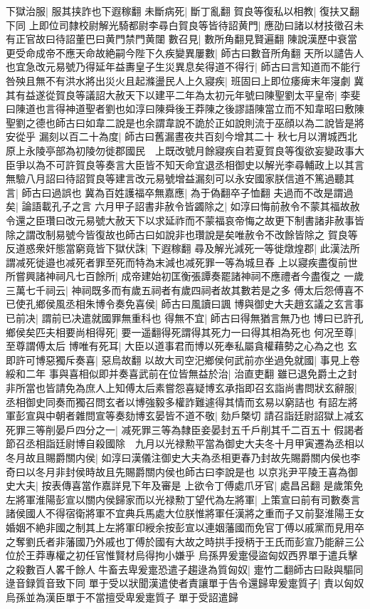 下獄治服|{
	服其挟詐也下遐稼翻}
未斷病死|{
	斷丁亂翻}
賀良等復私以相教|{
	復扶又翻下同}
上即位司隸校尉解光騎都尉李尋白賀良等皆待詔黄門|{
	應劭曰諸以材技徵召未有正官故曰待詔董巴曰黄門禁門黄闥}
數召見|{
	數所角翻見賢遍翻}
陳說漢歷中衰當更受命成帝不應天命故絶嗣今陛下久疾變異屢數|{
	師古曰數音所角翻}
天所以譴告人也宜急改元易號乃得延年益夀皇子生災異息矣得道不得行|{
	師古曰言知道而不能行}
咎殃且無不有洪水將出災火且起滌盪民人上久寢疾|{
	班固曰上即位痿痺末年寖劇}
冀其有益遂從賀良等議詔大赦天下以建平二年為太初元年號曰陳聖劉太平皇帝|{
	李斐曰陳道也言得神道聖者劉也如淳曰陳舜後王莽陳之後謬語陳當立而不知韋昭曰敷陳聖劉之德也師古曰如韋二說是也余謂韋說不詭於正如說則流于巫顔以為二說皆是將安從乎}
漏刻以百二十為度|{
	師古曰舊漏晝夜共百刻今增其二十}
秋七月以渭城西北原上永陵亭部為初陵勿徙郡國民　上既改號月餘寢疾自若夏賀良等復欲妄變政事大臣爭以為不可許賀良等奏言大臣皆不知天命宜退丞相御史以解光李尋輔政上以其言無驗八月詔曰待詔賀良等建言改元易號增益漏刻可以永安國家朕信道不篤過聽其言|{
	師古曰過誤也}
冀為百姓護福卒無嘉應|{
	為于偽翻卒子恤翻}
夫過而不改是謂過矣|{
	論語載孔子之言}
六月甲子詔書非赦令皆蠲除之|{
	如淳曰悔前赦令不蒙其福故赦令還之臣瓚曰改元易號大赦天下以求延祚而不蒙福哀帝悔之故更下制書諸非赦事皆除之謂改制易號今皆復故也師古曰如說非也瓚說是矣唯赦令不改餘皆除之}
賀良等反道惑衆奸態當窮竟皆下獄伏誅|{
	下遐稼翻}
尋及解光減死一等徙燉煌郡|{
	此漢法所謂减死徙邉也减死者罪至死而特為末減也减死罪一等為城旦舂}
上以寢疾盡復前世所嘗興諸神祠凡七百餘所|{
	成帝建始初匡衡張譚奏罷諸神祠不應禮者今盡復之}
一歲三萬七千祠云|{
	神祠既多而有歲五祠者有歲四祠者故其數若是之多}
傅太后怨傅喜不已使孔鄉侯風丞相朱博令奏免喜侯|{
	師古曰風讀曰諷}
博與御史大夫趙玄議之玄言事已前决|{
	謂前已决遣就國罪無重科也}
得無不宜|{
	師古曰得無猶言無乃也}
博曰已許孔鄉侯矣匹夫相要尚相得死|{
	要一遥翻得死謂得其死力一曰得其相為死也}
何况至尊|{
	至尊謂傅太后}
博唯有死耳|{
	大臣以道事君而博以死奉私屬貪權藉勢之心為之也}
玄即許可博惡獨斥奏喜|{
	惡烏故翻}
以故大司空汜鄉侯何武前亦坐過免就國|{
	事見上卷綏和二年}
事與喜相似即并奏喜武前在位皆無益於治|{
	治直吏翻}
雖已退免爵土之封非所當也皆請免為庶人上知傅太后素嘗怨喜疑博玄承指即召玄詣尚書問狀玄辭服|{
	丞相御史同奏而獨召問玄者以博強毅多權詐難遽得其情而玄易以窮詰也}
有詔左將軍彭宣與中朝者雜問宣等奏劾博玄晏皆不道不敬|{
	劾戶槩切}
請召詣廷尉詔獄上减玄死罪三等削晏戶四分之一|{
	减死罪三等為隸臣妾晏封五千戶削其千二百五十}
假謁者節召丞相詣廷尉博自殺國除　九月以光禄勲平當為御史大夫冬十月甲寅遷為丞相以冬月故且賜爵關内侯|{
	如淳曰漢儀注御史大夫為丞相更春乃封故先賜爵關内侯也李奇曰以冬月非封侯時故且先賜爵關内侯也師古曰李說是也}
以京兆尹平陵王喜為御史大夫|{
	按表傳喜當作嘉詳見下年及審是}
上欲令丁傅處爪牙官|{
	處昌呂翻}
是歲策免左將軍淮陽彭宣以關内侯歸家而以光禄勲丁望代為左將軍|{
	上策宣曰前有司數奏言諸侯國人不得宿衛將軍不宜典兵馬處大位朕惟將軍任漢將之重而子又前娶淮陽王女婚姻不絶非國之制其上左將軍印綬余按彭宣以連姻藩國而免官丁傅以戚黨而見用卒之奪劉氏者非藩國乃外戚也丁傅於國有大故之時拱手授柄于王氏而彭宣乃能辭三公位於王莽專權之初任官惟賢材烏得拘小嫌乎}
烏孫畀爰疐侵盜匈奴西界單于遣兵擊之殺數百人畧千餘人牛畜去卑爰疐恐遣子趨逯為質匈奴|{
	疐竹二翻師古曰敺與驅同逯音録質音致下同}
單于受以狀聞漢遣使者責讓單于告令還歸卑爰疐質子|{
	責以匈奴烏孫並為漢臣單于不當擅受卑爰疐質子}
單于受詔遣歸


